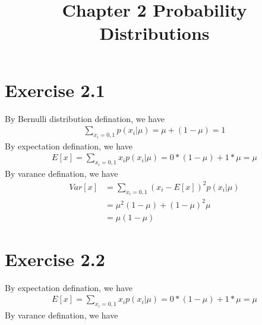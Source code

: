 \documentclass{article}
\title{Chapter 2 Probability Distributions}
\author{}
\date{}
\begin{document}
\maketitle
\section{Exercise 2.1}
By Bernulli distribution defination, we have
\begin{align}
    \sum_{x_i=0, 1} p(x_i|\mu) = \mu + (1 - \mu) = 1
\end{align}
By expectation defination, we have
\begin{align}
    E[x] = \sum_{x_i=0, 1} x_ip(x_i|\mu) = 0 * (1 - \mu) + 1 * \mu=\mu
\end{align}
By varance defination, we have
\begin{align}
    Var[x] & = \sum_{x_i=0, 1} (x_i - E[x])^2p(x_i|\mu) \\
    & = \mu^2 (1 - \mu) + (1 - \mu)^2 \mu \\
    & = \mu (1 - \mu)
\end{align}
\section{Exercise 2.2}
By expectation defination, we have
\begin{align}
    E[x] = \sum_{x_i=0, 1} x_ip(x_i|\mu) = 0 * (1 - \mu) + 1 * \mu=\mu
\end{align}
By varance defination, we have
\end{document}
